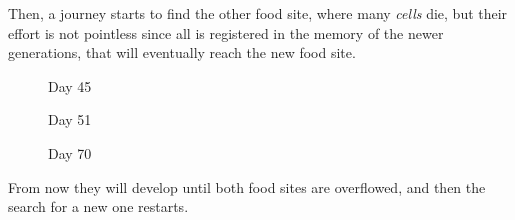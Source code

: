 \documentclass[a4paper,prd,twocolumn,nofootinbib,superscriptaddress,floatfix]{revtex4}
\begin{document}
 Then, a journey starts to find the other food site, where many \textit{cells} die, but their effort is not pointless since all is registered in the memory of the newer generations, that will eventually reach the new food site.



\begin{figure}[H] 
    \caption{Day 45} 
    \label{fig7:a} 
    \vspace{4ex}


    \caption{Day 51} 
    \label{fig7:b} 
    \vspace{4ex}
 

    \caption{Day 70} 
    \label{fig7:c} 
 
  \label{fig:7} 
\end{figure}
From now they will develop until both food sites are overflowed, and then the search for a new one restarts.
\end{document}
